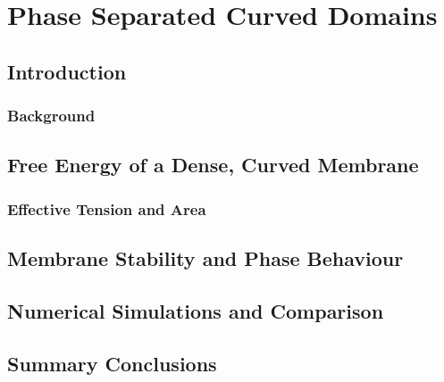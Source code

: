 \chapter{\label{ch:4-coupled}Phase Separated Curved Domains} 

\minitoc
\newpage
\section{Introduction}
\subsection{Background}

\section{Free Energy of a Dense, Curved Membrane}
\subsection{Effective Tension and Area}

\section{Membrane Stability and Phase Behaviour}

\section{Numerical Simulations and Comparison}

\section{Summary Conclusions}
